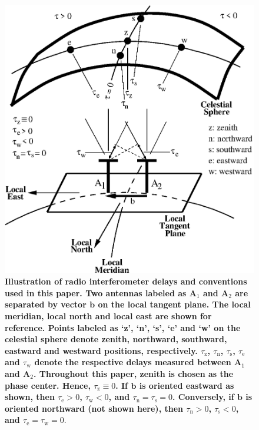 \documentclass[preprint2,iop,numberedappendix]{emulateapj}
\begin{document}
\begin{figure}[htb]
\centering
\includegraphics[width=\linewidth]{figure1.eps}
\caption{{\bf Illustration of radio interferometer delays and conventions used in this paper. Two antennas labeled as A$_1$ and A$_2$ are separated by vector $\boldsymbol{b}$ on the local tangent plane. The local meridian, local north and local east are shown for reference. Points labeled as `z', `n', `s', `e' and `w' on the celestial sphere denote zenith, northward, southward, eastward and westward positions, respectively. $\tau_\textrm{z}$, $\tau_\textrm{n}$, $\tau_\textrm{s}$, $\tau_\textrm{e}$ and $\tau_\textrm{w}$ denote the respective delays measured between A$_1$ and A$_2$. Throughout this paper, zenith is chosen as the phase center. Hence, $\tau_\textrm{z}\equiv 0$. If $\boldsymbol{b}$ is oriented eastward as shown, then $\tau_\textrm{e} > 0$, $\tau_\textrm{w} < 0$, and $\tau_\textrm{n}=\tau_\textrm{s}=0$. Conversely, if $\boldsymbol{b}$ is oriented northward (not shown here), then $\tau_\textrm{n} > 0$, $\tau_\textrm{s} < 0$, and $\tau_\textrm{e}=\tau_\textrm{w}=0$}. \label{fig:delay-cartoon}}
\end{figure}
\end{document}

